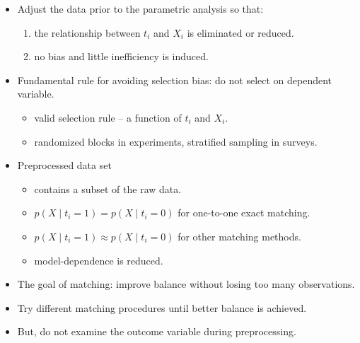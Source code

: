 \documentclass[20pt,landscape,pdftex]{foils}
\begin{document}
\begin{itemize}
\item Adjust the data prior to the parametric analysis so that:\pause
  \begin{enumerate}
  \item the relationship between $t_i$ and $X_i$ is eliminated or reduced.\pause
  \item no bias and little inefficiency is induced.\pause
  \end{enumerate}

\item Fundamental rule for avoiding selection bias: do not select on
  dependent variable.\pause 
  \begin{itemize}
  \item valid selection rule -- a function of $t_i$ and $X_i$.\pause 
  \item randomized blocks in experiments, stratified sampling in
    surveys.\pause
  \end{itemize}

\item Preprocessed data set\pause
  \begin{itemize}
  \item contains a subset of the raw data.\pause
  \item $p(X\mid t_i=1) = p(X\mid t_i=0)$ for one-to-one exact
    matching.\pause
  \item $p(X\mid t_i=1) \approx p(X\mid t_i=0)$ for other matching
    methods.\pause 
  \item model-dependence is reduced.\pause
  \end{itemize}
\end{itemize}



\hypersetup{pdfpagetransition=Replace}

\begin{itemize}
\zerolistvertdimens 
\item The goal of matching: improve balance without losing too many
  observations.\pause

\item Try different matching procedures until better balance is
  achieved.\pause

\item But, do not examine the outcome variable during
  preprocessing.\pause
\end{itemize}
  
\end{document}

